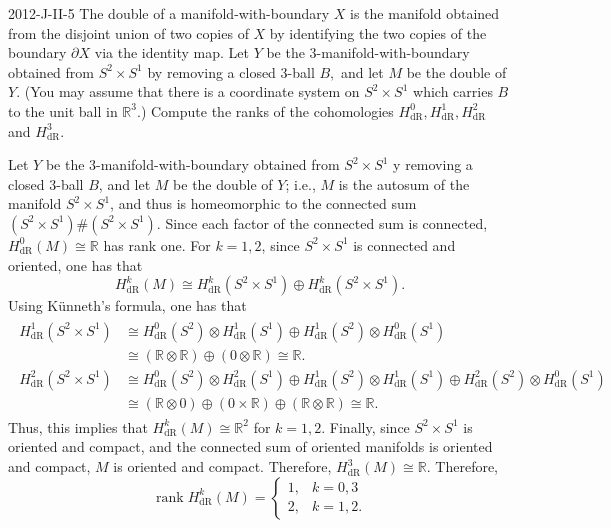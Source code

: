\documentclass{article}
\begin{document}
	\begin{prb}{2012-J-II-5}
		The double of a manifold-with-boundary $X$ is the manifold obtained from the disjoint union of two copies of $X$ by identifying the two copies of the boundary $\partial X$ via the identity map. Let $Y$ be the 3-manifold-with-boundary obtained from $S^2 \times S^1$ by removing a closed 3-ball $B,$ and let $M$ be the double of $Y.$ (You may assume that there is a coordinate system on $S^2 \times S^1$ which carries $B$ to the unit ball in $\mathbb{R}^3$.) Compute the ranks of the cohomologies $H_{\text{dR}}^0, H_{\text{dR}}^1, H_{\text{dR}}^2$ and $H_{\text{dR}}^3.$
	\end{prb}
	Let $Y$ be the 3-manifold-with-boundary obtained from $S^2 \times S^1$ y removing a closed 3-ball $B$, and let $M$ be the double of $Y$; i.e., $M$ is the autosum of the manifold $S^{2} \times S^{1}$, and thus is homeomorphic to the connected sum $(S^{2} \times S^{1}) \# (S^{2} \times S^{1})$. Since each factor of the connected sum is connected, $H^{0}_{\text{dR}}(M) \cong \mathbb{R}$ has rank one. For $k = 1, 2$, since $S^{2} \times S^{1}$ is connected and oriented, one has that 
	\begin{equation*}
		H^{k}_{\text{dR}}(M) \cong H^{k}_{\text{dR}}(S^{2} \times S^{1}) \oplus H^{k}_{\text{dR}}(S^{2} \times S^{1}). 
	\end{equation*}
	Using K\"unneth's formula, one has that 
	\begin{align*}
		\begin{split}
			H^{1}_{\text{dR}}(S^{2} \times S^{1}) &\cong H^{0}_{\text{dR}}(S^{2}) \otimes H^{1}_{\text{dR}}(S^{1}) \oplus H^{1}_{\text{dR}}(S^{2}) \otimes H^{0}_{\text{dR}}(S^{1}) \\
			&\cong (\mathbb{R} \otimes \mathbb{R}) \oplus (0 \otimes \mathbb{R}) \cong \mathbb{R}. \\
			H^{2}_{\text{dR}}(S^{2} \times S^{1}) &\cong H^{0}_{\text{dR}}(S^{2}) \otimes H^{2}_{\text{dR}}(S^{1}) \oplus H^{1}_{\text{dR}}(S^{2}) \otimes H^{1}_{\text{dR}}(S^{1}) \oplus H^{2}_{\text{dR}}(S^{2}) \otimes H^{0}_{\text{dR}}(S^{1}) \\
			&\cong (\mathbb{R} \otimes 0) \oplus (0 \times \mathbb{R}) \oplus (\mathbb{R} \otimes \mathbb{R}) \cong \mathbb{R}. 
		\end{split}
	\end{align*}
	Thus, this implies that $H^{k}_{\text{dR}}(M) \cong \mathbb{R}^{2}$ for $k = 1, 2$. Finally, since $S^{2} \times S^{1}$ is oriented and compact, and the connected sum of oriented manifolds is oriented and compact, $M$ is oriented and compact. Therefore, $H^{3}_{\text{dR}}(M) \cong \mathbb{R}$. Therefore, 
	\begin{equation*}
		\operatorname{rank}{H^{k}_{\text{dR}}(M)} = 
		\begin{cases}
			1, & k = 0, 3 \\
			2, & k = 1, 2.
		\end{cases}
	\end{equation*} 
	
\end{document}
